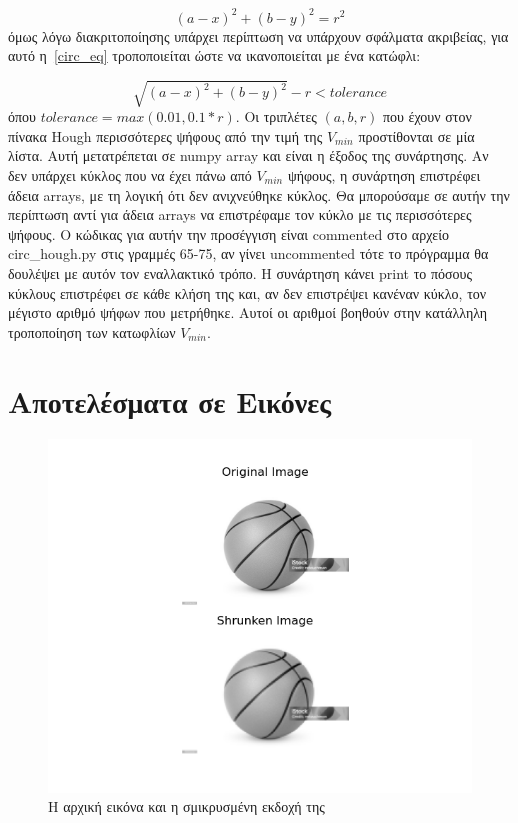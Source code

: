 \documentclass{article}
\begin{document}
\begin{equation}\label{circ_eq}
    (a - x)^2 + (b - y)^2 = r^2
\end{equation}
όμως λόγω διακριτοποίησης υπάρχει περίπτωση να υπάρχουν σφάλματα ακριβείας, για
αυτό η~\ref{circ_eq} τροποποι\-είται ώστε να ικανοποιείται με ένα κατώφλι:

\begin{equation}\label{circ_eq2}
    \sqrt{(a - x)^2 + (b - y)^2} - r < tolerance 
\end{equation}
όπου $tolerance = max(0.01, 0.1*r)$. Οι τριπλέτες $(a, b, r)$ που έχουν 
στον πίνακα Hough περισσότερες ψήφους από την τιμή της $V_{min}$ προστίθονται σε μία λίστα.
Αυτή μετατρέπεται σε numpy array και είναι η έξοδος της συνάρτησης. Αν
δεν υπάρχει κύκλος που να έχει πάνω από $V_{min}$ ψήφους, η συνάρτηση 
επιστρέφει άδεια arrays, με τη λογική ότι δεν ανιχνεύθηκε κύκλος. Θα μπορούσαμε 
σε αυτήν την περίπτωση αντί για άδεια arrays να επιστρέφαμε τον κύκλο με τις 
περισσότερες ψήφους. Ο κώδικας για αυτήν την προσέγγιση είναι commented στο 
αρχείο circ\_hough.py στις γραμμές 65-75, αν γίνει uncommented τότε το πρόγραμμα
θα δουλέψει με αυτόν τον εναλλακτικό τρόπο. Η συνάρτηση κάνει print το πόσους
κύκλους επιστρέφει σε κάθε κλήση της και, αν δεν επιστρέψει κανέναν κύκλο,
τον μέγιστο αριθμό ψήφων που μετρήθηκε. Αυτοί οι αριθμοί βοηθούν στην 
κατάλληλη τροποποίηση των κατωφλίων $V_{min}$.


\section{Αποτελέσματα σε Εικόνες}

\begin{figure}
    \centering
    \includegraphics[width=\textwidth]{origin_shrunk.png}
    \caption{Η αρχική εικόνα και η σμικρυσμένη εκδοχή της}\label{origin_shrunk}
\end{figure}
\end{document}

